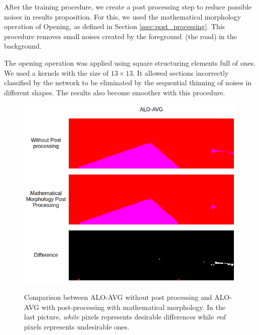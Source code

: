 After the training procedure, we create a post processing step to reduce possible noises in results proposition. For this, we used the mathematical morphology operation of Opening, as defined in Section \ref{ssec:post_processing}. This procedure removes small noises created by the foreground~(the road) in the background. 

The opening operation was applied using square structuring elements full of ones. We used a kernels with the size of $13\times13$. It allowed sections incorrectly classified by the network to be eliminated by the sequential thinning of noises in different shapes. The results also become smoother with this procedure.



\begin{figure}[h]
  \caption{Comparison between ALO-AVG without post processing and ALO-AVG with post-processing with mathematical morphology. In the last picture, \textit{white} pixels represents desirable differences while \textit{red} pixels represents undesirable ones.}
  \centering
  \includegraphics[width=1.\columnwidth]{figures/falreis/post_processing_comparison.png}
  \label{fig:post_processing_comp}
\end{figure}

